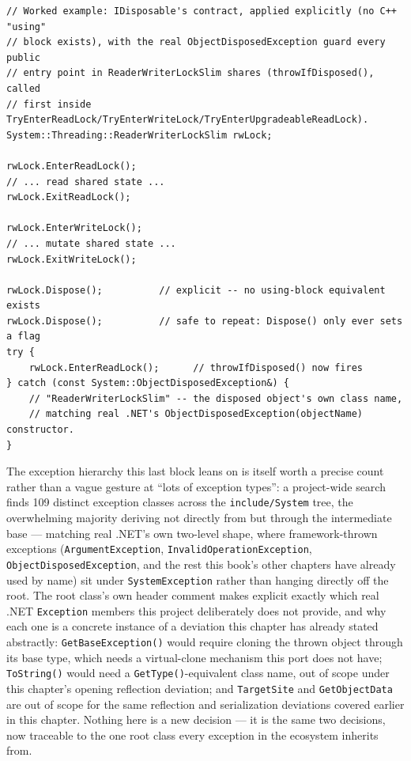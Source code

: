 \begin{lstlisting}
// Worked example: IDisposable's contract, applied explicitly (no C++ "using"
// block exists), with the real ObjectDisposedException guard every public
// entry point in ReaderWriterLockSlim shares (throwIfDisposed(), called
// first inside TryEnterReadLock/TryEnterWriteLock/TryEnterUpgradeableReadLock).
System::Threading::ReaderWriterLockSlim rwLock;

rwLock.EnterReadLock();
// ... read shared state ...
rwLock.ExitReadLock();

rwLock.EnterWriteLock();
// ... mutate shared state ...
rwLock.ExitWriteLock();

rwLock.Dispose();          // explicit -- no using-block equivalent exists
rwLock.Dispose();          // safe to repeat: Dispose() only ever sets a flag
try {
    rwLock.EnterReadLock();      // throwIfDisposed() now fires
} catch (const System::ObjectDisposedException&) {
    // "ReaderWriterLockSlim" -- the disposed object's own class name,
    // matching real .NET's ObjectDisposedException(objectName) constructor.
}
\end{lstlisting}

The exception hierarchy this last block leans on is itself worth a precise count rather than a
vague gesture at ``lots of exception types'': a project-wide search finds 109 distinct
exception classes across the \texttt{include/System} tree, the overwhelming majority deriving
not directly from  but through the intermediate
 base --- matching real .NET's own two-level shape, where
framework-thrown exceptions (\texttt{ArgumentException}, \texttt{InvalidOperationException},
\texttt{ObjectDisposedException}, and the rest this book's other chapters have already used by
name) sit under \texttt{SystemException} rather than hanging directly off the root. The root
class's own header comment makes explicit exactly which real .NET \texttt{Exception} members
this project deliberately does not provide, and why each one is a concrete instance of a
deviation this chapter has already stated abstractly: \texttt{GetBaseException()} would
require cloning the thrown object through its base type, which needs a virtual-clone mechanism
this port does not have; \texttt{ToString()} would need a \texttt{GetType()}-equivalent class
name, out of scope under this chapter's opening reflection deviation; and \texttt{TargetSite}
and \texttt{GetObjectData} are out of scope for the same reflection and serialization
deviations covered earlier in this chapter. Nothing here is a new decision --- it is the same
two decisions, now traceable to the one root class every exception in the ecosystem inherits
from.

